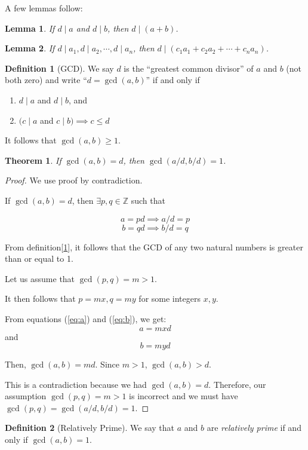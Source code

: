 \documentclass[english,notitlepage,smartquotes]{hgbreport}
\theoremstyle{definition}
\newtheorem*{definition}{Definition}
\theoremstyle{remark}
\theoremstyle{plain}
\newtheorem{theorem}{Theorem}[chapter]
\newtheorem{lemma}{Lemma}[chapter]
\begin{document}
A few lemmas follow:
\begin{lemma}
\label{lemma:divides-sum}
If $d\mid a$ and $d\mid b$, then $d\mid(a+b)$.
\end{lemma}
\begin{lemma}
\label{lemma:divides-lin-comb}
If $d\mid a_1,d\mid a_2,\cdots, d\mid a_n$, then $d\mid(c_1a_1+c_2a_2+\cdots+c_na_n)$.
\end{lemma}
\begin{definition}[GCD]
\label{def:gcd}
We say $d$ is the ``greatest common divisor'' of $a$ and $b$ (not both zero) and write ``$d=\gcd(a, b)$'' if and only if
\begin{enumerate}
\item $d\mid a$ and $d\mid b$, and
\item $(c\mid a$ and $c\mid b)\implies c\leq d$
\end{enumerate}
\end{definition}

It follows that $\gcd(a, b)\geq 1$.

\begin{theorem}
\label{thm:gcd-multiple}
If $\gcd(a,b)=d$, then $\gcd(a/d, b/d)=1$.
\end{theorem}

\begin{proof}
We use proof by contradiction.

If $\gcd(a,b)=d$, then $\exists p,q\in\mathbb{Z}$ such that

\begin{equation}
\label{eq:a}
a=pd\implies a/d=p
\end{equation}
\begin{equation}
\label{eq:b}
b=qd\implies b/d=q
\end{equation}

From definition[\ref{def:gcd}], it follows that the GCD of any two natural numbers is greater than or equal to 1. 

Let us assume that $\gcd(p, q)=m>1$.

It then follows that $p=mx,q=my$ for some integers $x, y$.

From equations (\ref{eq:a}) and (\ref{eq:b}), we get:
$$
a=mxd
$$
and
$$
b=myd
$$

Then, $\gcd(a, b)=md$. Since $m>1$, $\gcd(a, b) > d$.

This is a contradiction because we had $\gcd(a,b)=d$. Therefore, our assumption $\gcd(p,q)=m>1$ is incorrect and we must have $\gcd(p,q)=\gcd(a/d,b/d)=1$.
\end{proof}
\begin{definition}[Relatively Prime]
We say that $a$ and $b$ are \emph{relatively prime} if and only if $\gcd(a,b)=1$.
\end{definition}
\end{document}
